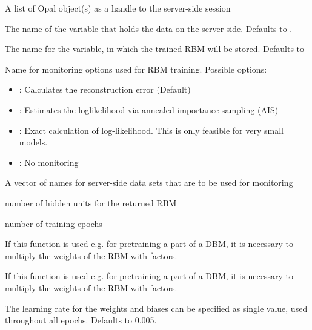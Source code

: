 \begin{Arguments}
\begin{ldescription}
\item[\code{datasources}] A list of Opal object(s) as a handle to the server-side session

\item[\code{data}] The name of the variable that holds the data on the server-side.
Defaults to .

\item[\code{newobj}] The name for the variable, in which the trained RBM will be stored.
Defaults to 

\item[\code{monitoring}] Name for monitoring options used for RBM training.
Possible options:
\begin{itemize}

\item {}: Calculates the reconstruction error (Default)
\item {}: Estimates the loglikelihood via annealed importance sampling (AIS)
\item {}: Exact calculation of log-likelihood.
This is only feasible for very small models.
\item {}: No monitoring

\end{itemize}


\item[\code{monitoringdata}] A vector of names for server-side data sets that are to be used for
monitoring

\item[\code{nhidden}] number of hidden units for the returned RBM

\item[\code{epochs}] number of training epochs

\item[\code{upfactor}] If this function is used e.g. for pretraining a part of
a DBM, it is necessary to multiply the weights of the RBM with factors.

\item[\code{downfactor}] If this function is used e.g. for pretraining a part of
a DBM, it is necessary to multiply the weights of the RBM with factors.

\item[\code{learningrate}] The learning rate for the weights and biases
can be specified as single value, used throughout all epochs. Defaults to 0.005.


\end{ldescription}
\end{Arguments}
